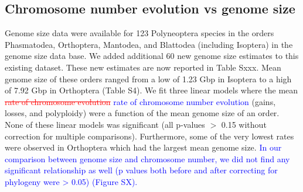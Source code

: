 \documentclass[]{rsos}%
\begin{document}
\subsection{Chromosome number evolution vs genome size}
Genome size data were available for 123 Polyneoptera species in the orders Phasmatodea, Orthoptera, Mantodea, and Blattodea (including Isoptera) in the genome size data base. We added additional 60 new genome size estimates to this existing dataset. These new estimates are now reported in Table Sxxx.
Mean genome size of these orders ranged from a low of 1.23 Gbp in Isoptera to a high of 7.92 Gbp in Orthoptera (Table S4).
We fit three linear models where the mean \textcolor{red}{\st{rate of chromosome evolution}} \textcolor{blue}{rate of chromosome number evolution} (gains, losses, and polyploidy) were a function of the mean genome size of an order.
None of these linear models was significant (all p-values $>$ 0.15 without correction for multiple comparisons).
Furthermore, some of the very lowest rates were observed in Orthoptera which had the largest mean genome size.
\textcolor{blue}{In our comparison between genome size and chromosome number, we did not find any significant relationship as well (p values both before and after correcting for phylogeny were > 0.05) (Figure SX).}
\end{document}
